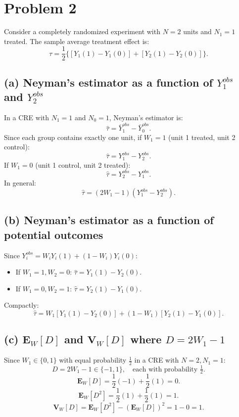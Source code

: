 \documentclass[11pt]{article}
\begin{document}
\section*{Problem 2}

Consider a completely randomized experiment with $N=2$ units and $N_1 = 1$ treated. The sample average treatment effect is:
\[
  \tau = \frac{1}{2}\{[Y_1(1) - Y_1(0)] + [Y_2(1) - Y_2(0)]\}.
\]

\subsection*{(a) Neyman's estimator as a function of $Y_1^{obs}$ and $Y_2^{obs}$}

In a CRE with $N_1 = 1$ and $N_0 = 1$, Neyman's estimator is:
\[
  \hat{\tau} = \bar{Y}_1^{obs} - \bar{Y}_0^{obs}.
\]
Since each group contains exactly one unit, if $W_1 = 1$ (unit 1 treated, unit 2 control):
\[
  \hat{\tau} = Y_1^{obs} - Y_2^{obs}.
\]
If $W_1 = 0$ (unit 1 control, unit 2 treated):
\[
  \hat{\tau} = Y_2^{obs} - Y_1^{obs}.
\]
In general:
\[
  \hat{\tau} = (2W_1 - 1)(Y_1^{obs} - Y_2^{obs}).
\]

\subsection*{(b) Neyman's estimator as a function of potential outcomes}

Since $Y_i^{obs} = W_i Y_i(1) + (1-W_i)Y_i(0)$:
\begin{itemize}
  \item If $W_1=1, W_2=0$: $\hat{\tau} = Y_1(1) - Y_2(0)$.
  \item If $W_1=0, W_2=1$: $\hat{\tau} = Y_2(1) - Y_1(0)$.
\end{itemize}
Compactly:
\[
  \hat{\tau} = W_1[Y_1(1) - Y_2(0)] + (1-W_1)[Y_2(1) - Y_1(0)].
\]

\subsection*{(c) $\mathbf{E}_W[D]$ and $\mathbf{V}_W[D]$ where $D = 2W_1 - 1$}

Since $W_1 \in \{0,1\}$ with equal probability $\frac{1}{2}$ in a CRE with $N=2, N_1=1$:
\[
  D = 2W_1 - 1 \in \{-1, 1\}, \quad \text{each with probability } \tfrac{1}{2}.
\]
\[
  \mathbf{E}_W[D] = \frac{1}{2}(-1) + \frac{1}{2}(1) = 0.
\]
\[
  \mathbf{E}_W[D^2] = \frac{1}{2}(1) + \frac{1}{2}(1) = 1.
\]
\[
  \mathbf{V}_W[D] = \mathbf{E}_W[D^2] - (\mathbf{E}_W[D])^2 = 1 - 0 = 1.
\]
\end{document}
